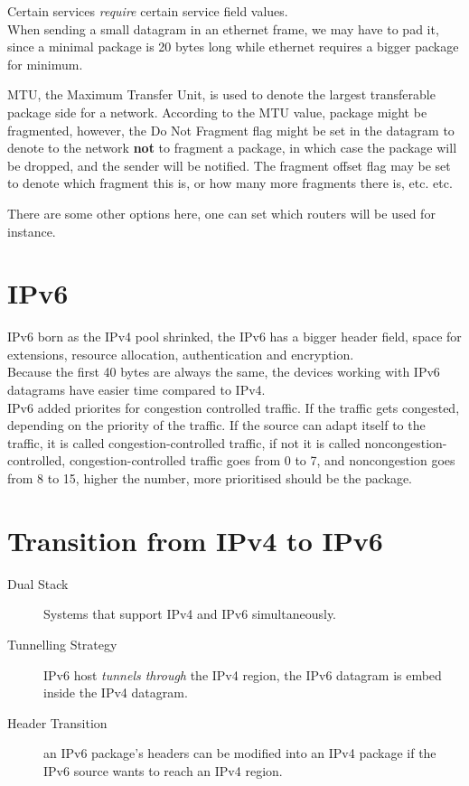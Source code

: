 \documentclass[11pt,a4paper,twoside]{book}
\begin{document}
Certain services \textit{require} certain service field values.\\

When sending a small datagram in an ethernet frame, we may have to pad it, since a minimal package is 20 bytes long while ethernet requires a bigger package for minimum.

MTU, the Maximum Transfer Unit, is used to denote the largest transferable package side for a network. According to the MTU value, package might be fragmented, however, the Do Not Fragment flag might be set in the datagram to denote to the network \textbf{not} to fragment a package, in which case the package will be dropped, and the sender will be notified. The fragment offset flag may be set to denote which fragment this is, or how many more fragments there is, etc. etc.

There are some other options here, one can set which routers will be used for instance.

\section{IPv6}

IPv6 born as the IPv4 pool shrinked, the IPv6 has a bigger header field, space for extensions, resource allocation, authentication and encryption.\\

Because the first 40 bytes are always the same, the devices working with IPv6 datagrams have easier time compared to IPv4.\\

IPv6 added priorites for congestion controlled traffic. If the traffic gets congested, depending on the priority of the traffic. If the source can adapt itself to the traffic, it is called congestion-controlled traffic, if not it is called noncongestion-controlled, congestion-controlled traffic goes from 0 to 7, and noncongestion goes from 8 to 15, higher the number, more prioritised should be the package.

\section{Transition from IPv4 to IPv6}

\begin{description}
\item[Dual Stack] Systems that support IPv4 and IPv6 simultaneously.
\item[Tunnelling Strategy] IPv6 host \textit{tunnels through} the IPv4 region, the IPv6 datagram is embed inside the IPv4 datagram.
\item[Header Transition] an IPv6 package's headers can be modified into an IPv4 package if the IPv6 source wants to reach an IPv4 region.
\end{description}
\end{document}

